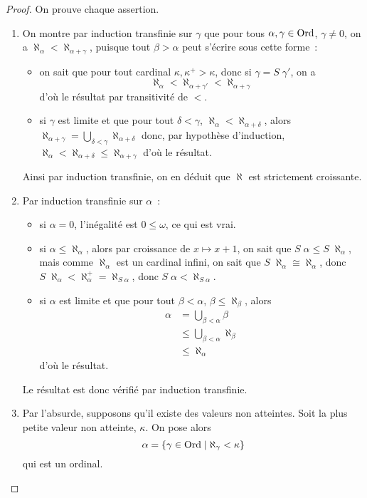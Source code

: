 \begin{proof}
  On prouve chaque assertion.
  \begin{enumerate}[label=(\roman*)]
  \item On montre par induction transfinie sur $\gamma$ que pour tous
    $\alpha,\gamma \in \operatorname{Ord}$, $\gamma\neq 0$, on a
    $\aleph_{\alpha} < \aleph_{\alpha + \gamma}$, puisque tout $\beta > \alpha$ peut
    s'écrire sous cette forme~:
    \begin{itemize}
    \item on sait que pour tout cardinal $\kappa, \kappa^+ > \kappa$, donc si
      $\gamma = S\;\gamma'$, on a
      \[\aleph_{\alpha} < \aleph_{\alpha + \gamma'}
      < \aleph_{\alpha + \gamma}\]
      d'où le résultat par transitivité de $<$.
    \item si $\gamma$ est limite et que pour tout $\delta < \gamma$,
      $\aleph_{\alpha} < \aleph_{\alpha + \delta}$, alors
      $\aleph_{\alpha + \gamma} = \bigcup_{\delta < \gamma} \aleph_{\alpha + \delta}$
      donc, par hypothèse d'induction,
      $\aleph_{\alpha} < \aleph_{\alpha + \delta} \leq \aleph_{\alpha + \gamma}$
      d'où le résultat.
    \end{itemize}
    Ainsi par induction transfinie, on en déduit que $\aleph$ est strictement
    croissante.
  \item Par induction transfinie sur $\alpha$~:
    \begin{itemize}
    \item si $\alpha = 0$, l'inégalité est $0\leq \omega$, ce qui est vrai.
    \item si $\alpha \leq \aleph_\alpha$, alors par croissance de
      $x\mapsto x + 1$, on sait que $S\;\alpha \leq S\;\aleph_\alpha$, mais
      comme $\aleph_\alpha$ est un cardinal infini, on sait que
      $S\;\aleph_\alpha \cong \aleph_\alpha$, donc
      $S\;\aleph_\alpha < \aleph_\alpha^+ = \aleph_{S\;\alpha}$, donc
      $S\;\alpha < \aleph_{S\;\alpha}$.
    \item si $\alpha$ est limite et que pour tout $\beta < \alpha$,
      $\beta \leq \aleph_\beta$, alors
      \begin{align*}
        \alpha &= \bigcup_{\beta < \alpha} \beta\\
        &\leq \bigcup_{\beta < \alpha} \aleph_\beta\\
        &\leq \aleph_\alpha
      \end{align*}
      d'où le résultat.
    \end{itemize}
    Le résultat est donc vérifié par induction transfinie.
  \item Par l'absurde, supposons qu'il existe des valeurs non atteintes. Soit la
    plus petite valeur non atteinte, $\kappa$. On pose alors
    \[\alpha = \{\gamma \in \operatorname{Ord} \mid \aleph_\gamma < \kappa\}\]
    qui est un ordinal.
    

\end{enumerate}
\end{proof}
